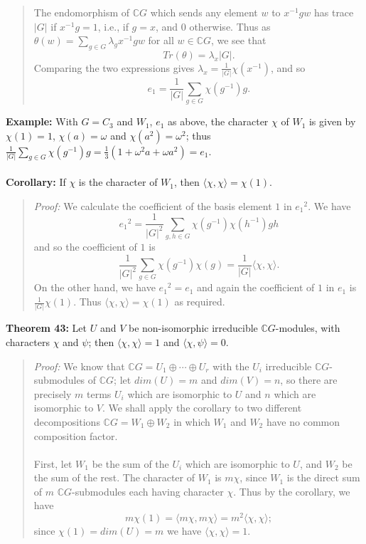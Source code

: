 {\begin{quote}
The endomorphism of ${\mathbb C}G$ which sends any element $w$ to $x^{-1}gw$ has trace
$|G|$ if $x^{-1}g=1$, i.e., if $g=x$, and $0$ otherwise. Thus as
$\theta(w)=\sum_{g\in G}\lambda_gx^{-1}gw$ for all $w\in{\mathbb C}G$, we see that
$$Tr(\theta)=\lambda_x|G|.$$
Comparing the two expressions gives $\lambda_x=\frac{1}{|G|}\chi(x^{-1})$,
and so
$$e_1=\frac{1}{|G|}\sum_{g\in G}\chi(g^{-1})g.$$
\end{quote}
{\bf Example:} With $G=C_3$ and $W_1$, $e_1$ as above, the character
$\chi$ of $W_1$ is given by $\chi(1)=1$, $\chi(a)=\omega$ and
$\chi(a^2)=\omega^2$; thus $\frac{1}{|G|}\sum_{g\in G}\chi(g^{-1})g
=\frac{1}{3}(1+\omega^2a+\omega a^2)=e_1$.
\\
\\
{\bf Corollary:} If $\chi$ is the character of $W_1$, then
$\langle\chi,\chi\rangle=\chi(1)$.
\begin{quote}
\emph{Proof:}
We calculate the coefficient of the basis element $1$ in ${e_1}^2$.
We have
$${e_1}^2=\frac{1}{|G|^2}\sum_{g,h\in G}\chi(g^{-1})\chi(h^{-1})gh$$
and so the coefficient of $1$ is
$$\frac{1}{|G|^2}\sum_{g\in G}\chi(g^{-1})\chi(g)
=\frac{1}{|G|}\langle\chi,\chi\rangle.$$
On the other hand, we have ${e_1}^2=e_1$ 
and again the coefficient of $1$ in $e_1$ is $\frac{1}{|G|}\chi(1)$. Thus
$\langle\chi,\chi\rangle=\chi(1)$ as required.
\end{quote}
{\bf Theorem 43:} Let $U$ and $V$ be non-isomorphic irreducible
${\mathbb C}G$-modules, with characters $\chi$ and $\psi$; then
$\langle\chi,\chi\rangle=1$ and $\langle\chi,\psi\rangle=0$.
\begin{quote}
\emph{Proof:}
We know that ${\mathbb C}G=U_1\oplus\cdots\oplus U_r$ with the $U_i$ irreducible
${\mathbb C}G$-submodules of ${\mathbb C}G$; let $dim (U)=m$ and $dim(V)=n$, so 
there are precisely $m$ terms $U_i$ which are isomorphic to $U$ and
$n$ which are isomorphic to $V$. We shall apply the corollary to two different
decompositions ${\mathbb C}G=W_1\oplus W_2$ in which $W_1$ and $W_2$ have no
common composition factor.
\\
\\
First, let $W_1$ be the sum of the $U_i$ which are isomorphic to
$U$, and $W_2$ be the sum of the rest. The character of $W_1$ is
$m\chi$, since $W_1$ is the direct sum of $m$ ${\mathbb C}G$-submodules each having
character $\chi$. Thus by the corollary,  we have
$$m\chi(1)=\langle m\chi,m\chi\rangle=m^2\langle\chi,\chi\rangle;$$
since $\chi(1)=dim(U) =m$ we have $\langle\chi,\chi\rangle=1$.
\\

\end{quote}}
